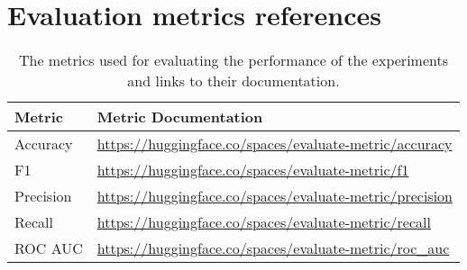 \section{Evaluation metrics references}

\begin{table}[ht]
    \captionsetup{font=small}
    \centering
    \begin{tabularx}{\textwidth}{|l|X|}
        \hline
        \rowcolor[gray]{0.7}
        \textbf{Metric} & \textbf{Metric Documentation}                                         \\
        \hline

        Accuracy        & \small{\url{https://huggingface.co/spaces/evaluate-metric/accuracy}}  \\
        \hline
        F1              & \small{\url{https://huggingface.co/spaces/evaluate-metric/f1}}        \\
        \hline
        Precision       & \small{\url{https://huggingface.co/spaces/evaluate-metric/precision}} \\
        \hline
        Recall          & \small{\url{https://huggingface.co/spaces/evaluate-metric/recall}}    \\
        \hline
        ROC AUC         & \small{\url{https://huggingface.co/spaces/evaluate-metric/roc_auc}}   \\
        \hline
    \end{tabularx}
    \caption{The metrics used for evaluating the performance of the experiments and links to their documentation.}
    \label{tab: apdxb_metric_doc}
\end{table}